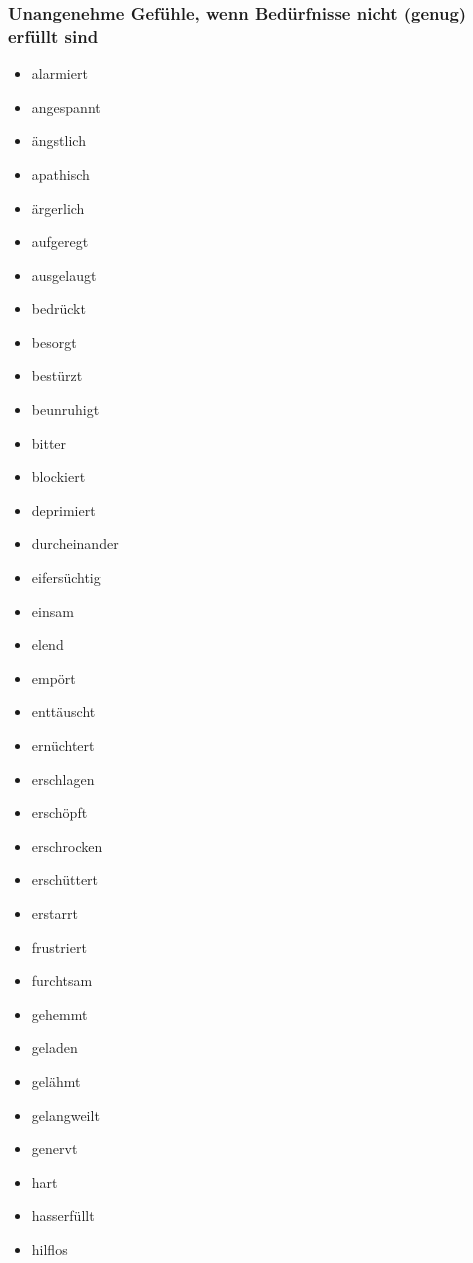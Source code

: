 \subsubsection{Unangenehme Gefühle, wenn Bedürfnisse nicht (genug) erfüllt sind}
\label{unangenehme-gefuehle}

\begin{multicols}{2}
  \begin{itemize}
    \item alarmiert
    \item angespannt
    \item ängstlich
    \item apathisch
    \item ärgerlich
    \item aufgeregt
    \item ausgelaugt
    \item bedrückt
    \item besorgt
    \item bestürzt
    \item beunruhigt
    \item bitter
    \item blockiert
    \item deprimiert
    \item durcheinander
    \item eifersüchtig
    \item einsam
    \item elend
    \item empört
    \item enttäuscht
    \item ernüchtert
    \item erschlagen
    \item erschöpft
    \item erschrocken
    \item erschüttert
    \item erstarrt
    \item frustriert
    \item furchtsam
    \item gehemmt
    \item geladen
    \item gelähmt
    \item gelangweilt
    \item genervt
    \item hart
    \item hasserfüllt
    \item hilflos

\end{itemize}
\end{multicols}
